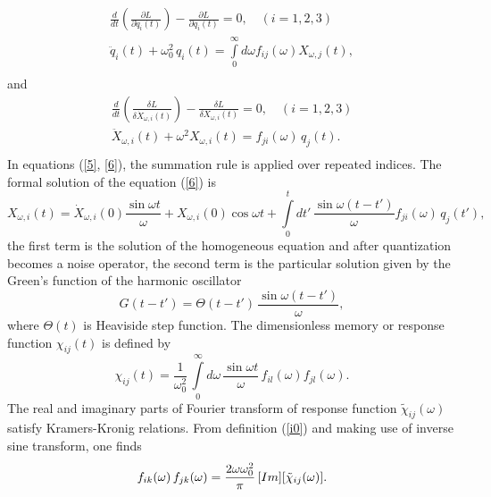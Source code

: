 \documentclass[preprint,showpacs,showkeys,groupedaddress,superscriptaddress]{revtex4}
\begin{document}
\begin{equation}\label{5}
\begin{array}{l}
 \frac{d}{{dt}}\left( {\frac{{\partial L}}{{\partial {\dot{q}} _i (t)}}} \right) - \frac{{\partial L}}{{\partial q_i (t)}} = 0,\,\,\,\,\,\,(i = 1,2,3) \\
 {\ddot{q}} _i (t) + \omega _0^2 \,q_i (t) = \int\limits_0^\infty  {d\omega } f_{ij} (\omega )X_{\omega, j} (t), \\
 \end{array}
\end{equation}
and
\begin{equation}\label{6}
\begin{array}{l}
 \frac{d}{dt}\left(\frac{\delta L}{\delta {\dot{X}} _{\omega, i} (t)}\right) - \frac{{\delta L}}{{\delta X_{\omega, i} (t)}} = 0,\,\,\,\,\,\,
 (i = 1,2,3) \\
{\ddot{X}} _{\omega, i} (t) + \omega ^2 X_{\omega, i} (t) = f_{ji} (\omega )\,q_j (t). \\
\end{array}
\end{equation}
In equations (\ref{5}, \ref{6}), the summation rule is applied over repeated indices. The formal solution of the equation (\ref{6}) is
\begin{equation}\label{8}
X_{\omega, i} (t) = {\dot{X}} _{\omega, i} (0)\frac{{\sin \omega t}}{\omega } + X_{\omega, i} (0)\cos \omega t + \int\limits_0^t {dt'}\,\frac{{\sin \omega (t - t')}}{\omega }f_{ji} (\omega )\,q_j (t'),
\end{equation}
the first term is the solution of the homogeneous equation and after quantization becomes a noise operator, the second term is the particular solution given by the Green's function of the harmonic oscillator
\begin{equation}\label{Green}
 G(t-t')=\Theta (t-t')\,\frac{{\sin \omega (t - t')}}{\omega },
\end{equation}
where $\Theta(t)$ is Heaviside step function. The dimensionless memory or response function $\chi_{ij} (t)$ is defined by
\begin{equation}\label{i0}
\chi _{ij} (t) =\frac{1}{\omega_0^2}\,\int\limits_0^\infty d\omega\,\frac{{\sin \omega t}}{\omega }\,f_{il} (\omega ) f_{jl} (\omega ).
\end{equation}
The real and imaginary parts of Fourier transform of response function $\tilde{\chi }_{ij}(\omega)$ satisfy Kramers-Kronig relations. From definition (\ref{i0}) and making use of inverse sine transform, one finds
\begin{equation}\label{Cgen}
  f_{ik} (\omega)\,f_{jk} (\omega)=\frac{2 \omega\omega_0^2}{\pi}\,\mbox[Im] [\tilde{\chi}_{ij} (\omega)].
\end{equation}
\end{document}
